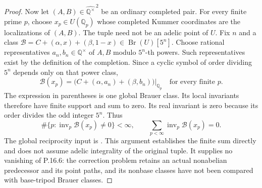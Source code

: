 \begin{proof}
Now let $(A,B)\in\widehat{\mathbb Q^{\times}}^{\,2}$ be an
ordinary completed pair. For every finite prime $p$, choose
$x_p\in U(\mathbb Q_p)$ whose completed Kummer coordinates are
the localizations of $(A,B)$. The tuple need not be an adelic
point of $U$. Fix $n$ and a class
$\mathcal B=C+(\alpha,x)+(\beta,1-x)\in\operatorname{Br}(U)[5^n]$.
Choose rational representatives $a_n,b_n\in\mathbb Q^{\times}$
of $A,B$ modulo $5^n$-th powers. Such representatives exist by
the definition of the completion. Since a cyclic symbol of
order dividing $5^n$ depends only on that power class,
\[
 \mathcal B(x_p)
   =\bigl(C+(\alpha,a_n)+(\beta,b_n)\bigr)|_{\mathbb Q_p}
   \quad\text{for every finite }p.
 \tag{P.16.15}
\]
The expression in parentheses is one global Brauer class.
Its local invariants therefore have finite support and sum to
zero. Its real invariant is zero because its order divides the
odd integer $5^n$. Thus
\[
 \#\{p:\operatorname{inv}_p\mathcal B(x_p)\ne0\}<\infty,
 \qquad
 \sum_{p<\infty}\operatorname{inv}_p\mathcal B(x_p)=0.
 \tag{P.16.16}
\]
The global reciprocity input is
\citet[Theorem~12.1.8, p.~243]{RecoveryColliotTheleneSkorobogatov2019}.
This argument establishes the finite sum directly and does not
assume adelic integrality of the original tuple. It supplies no
vanishing of P.16.6: the correction problem retains an actual
nonabelian predecessor and its point paths, and its nonbase
classes have not been compared with base-tripod Brauer classes.

\end{proof}
